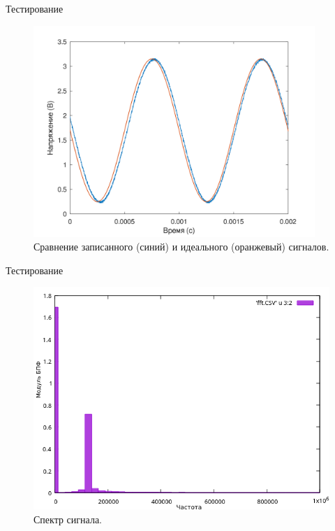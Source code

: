 \documentclass[10pt]{beamer}
\begin{document}
\begin{frame}{Тестирование}
  \begin{figure}
  \includegraphics[width=0.95\textwidth]{test}
  \caption*{Сравнение записанного (синий) и идеального (оранжевый) сигналов.}
  \end{figure}
\end{frame}

\begin{frame}{Тестирование}
  \begin{figure}
  \includegraphics[width=1\textwidth]{fft}
  \caption*{Спектр сигнала.}
  \end{figure}
\end{frame}
\end{document}
